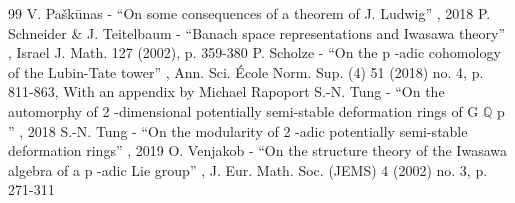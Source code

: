 \documentclass[11pt]{article}
\theoremstyle{definition}
\begin{document}
\begin{thebibliography}{99}
 V. Paškūnas - “On some consequences of a theorem of J. Ludwig” , 2018
 P. Schneider \& J. Teitelbaum - “Banach space representations and Iwasawa theory” , Israel J. Math. 127 (2002), p. 359-380
 P. Scholze - “On the p -adic cohomology of the Lubin-Tate tower” , Ann. Sci. École Norm. Sup. (4) 51 (2018) no. 4, p. 811-863, With an appendix by Michael Rapoport
 S.-N. Tung - “On the automorphy of 2 -dimensional potentially semi-stable deformation rings of G \(\mathbb Q\) p ” , 2018
 S.-N. Tung - “On the modularity of 2 -adic potentially semi-stable deformation rings” , 2019
 O. Venjakob - “On the structure theory of the Iwasawa algebra of a p -adic Lie group” , J. Eur. Math. Soc. (JEMS) 4 (2002) no. 3, p. 271-311
\end{thebibliography}
\end{document}
